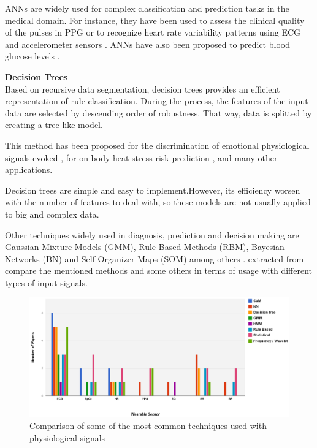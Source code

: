 \begin{description}
{	ANNs are widely used for complex classification and prediction tasks in the medical domain. For instance, they have been used to assess the clinical quality of the pulses in PPG \cite{li2012dynamic} or to recognize heart rate variability patterns using ECG and accelerometer sensors \cite{vu2010online}. ANNs have also been proposed to predict blood glucose levels \cite{chatterjee2013persuasive}.}

	\item {\textbf{Decision Trees}\hfill \\
	Based on recursive data segmentation, decision trees provides an efficient representation of rule classification. During the process, the
	features of the input data are selected by descending order of robustness. That way, data is splitted by creating a tree-like model.

	This method has been proposed for the discrimination of emotional physiological signals evoked \cite{frantzidis2010classification}, for on-body heat stress risk prediction \cite{gaura2013leveraging}, and many other applications.

	Decision trees are simple and easy to implement.However, its efficiency worsen with the number of features to deal with, so these models are not usually applied to big and complex data.
	}

\end{description}

Other techniques widely used in diagnosis, prediction and decision making are Gaussian Mixture Models (GMM), Rule-Based Methods (RBM), Bayesian Networks (BN) and Self-Organizer Maps (SOM) among others \cite{banaee2013data, bellazzi2008predictive, fu2011review}.  extracted from \cite{banaee2013data} compare the mentioned methods and some others in terms of usage with different types of input signals.

\begin{figure}[!ht]
\centering
\includegraphics[width=\textwidth]{images/stateartalgorithms.png}
\caption{Comparison of some of the most common techniques used with physiological signals}
\label{fig:stateart_algorithms}
\end{figure}
